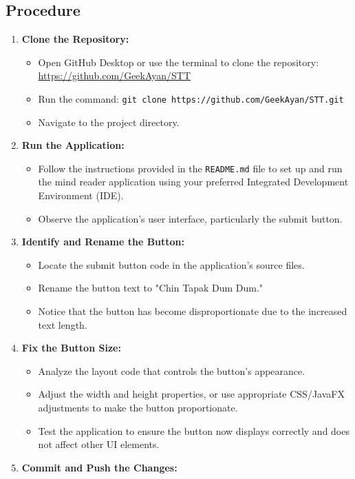 \documentclass{article}
\begin{document}
\subsection*{Procedure}
\begin{enumerate}[label=\arabic*.]
    \item \textbf{Clone the Repository:}
    \begin{itemize}
        \item Open GitHub Desktop or use the terminal to clone the repository: \url{https://github.com/GeekAyan/STT}
        \item Run the command: \texttt{git clone https://github.com/GeekAyan/STT.git}
        \item Navigate to the project directory.
    \end{itemize}
    \item \textbf{Run the Application:}
    \begin{itemize}
        \item Follow the instructions provided in the \texttt{README.md} file to set up and run the mind reader application using your preferred Integrated Development Environment (IDE).
        \item Observe the application's user interface, particularly the submit button.
    \end{itemize}
    \item \textbf{Identify and Rename the Button:}
    \begin{itemize}
        \item Locate the submit button code in the application’s source files.
        \item Rename the button text to "Chin Tapak Dum Dum."
        \item Notice that the button has become disproportionate due to the increased text length.
    \end{itemize}
    \item \textbf{Fix the Button Size:}
    \begin{itemize}
        \item Analyze the layout code that controls the button's appearance.
        \item Adjust the width and height properties, or use appropriate CSS/JavaFX adjustments to make the button proportionate.
        \item Test the application to ensure the button now displays correctly and does not affect other UI elements.
    \end{itemize}
    \item \textbf{Commit and Push the Changes:}

\end{enumerate}
\end{document}

